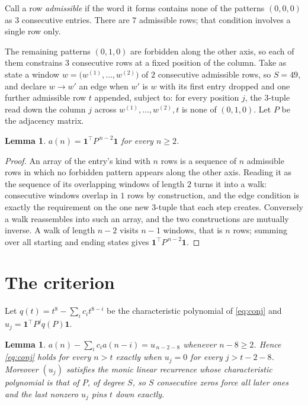 \documentclass[11pt,a4paper]{article}
\theoremstyle{plain}
\newtheorem{lemma}[theorem]{Lemma}
\theoremstyle{definition}
\begin{document}
Call a row \emph{admissible} if the word it forms contains none of the patterns
$(0,0,0)$ as $3$ consecutive entries. There are $7$ admissible rows; that condition
involves a single row only.

The remaining patterns $(0,1,0)$ are forbidden along the other axis, so each of them
constrains $3$ consecutive rows at a fixed position of the column. Take as state a
window $w=\bigl(w^{(1)},\dots,w^{(2)}\bigr)$ of $2$ consecutive admissible
rows, so $S=49$, and declare $w\to w'$ an edge when $w'$ is $w$ with its first entry
dropped and one further admissible row $t$ appended, subject to: for every position
$j$, the $3$-tuple read down the column $j$ across $w^{(1)},\dots,w^{(2)},t$
is none of $(0,1,0)$. Let $P$ be the adjacency matrix.

\begin{lemma}\label{lem:walk}
$a(n)=\mathbf{1}^{\!\top}P^{\,n-2}\mathbf{1}$ for every $n\ge2$.
\end{lemma}

\begin{proof}
An array of the entry's kind with $n$ rows is a sequence of $n$ admissible rows in
which no forbidden pattern appears along the other axis. Reading it as the sequence of its
overlapping windows of length $2$ turns it into a walk: consecutive windows overlap in
$1$ rows by construction, and the edge condition is exactly the requirement on the one
new $3$-tuple that each step creates. Conversely a walk reassembles into such an array,
and the two constructions are mutually inverse. A walk of length $n-2$ visits $n-1$
windows, that is $n$ rows; summing over all starting and ending states gives
$\mathbf{1}^{\!\top}P^{\,n-2}\mathbf{1}$.
\end{proof}

\section{The criterion}

Let $q(t)=t^{8}-\sum_i c_i t^{8-i}$ be the characteristic polynomial of
\eqref{eq:conj} and $u_j=\mathbf{1}^{\!\top}P^{j}q(P)\mathbf{1}$.

\begin{lemma}\label{lem:crit}
$a(n)-\sum_i c_i a(n-i)=u_{\,n-2-8}$ whenever $n-8\ge2$. Hence
\eqref{eq:conj} holds for every $n>t$ exactly when $u_j=0$ for every
$j>t-2-8$. Moreover $(u_j)$ satisfies the monic linear recurrence whose
characteristic polynomial is that of $P$, of degree $S$, so $S$ consecutive zeros force all
later ones and the last nonzero $u_j$ pins $t$ down exactly.
\end{lemma}
\end{document}
